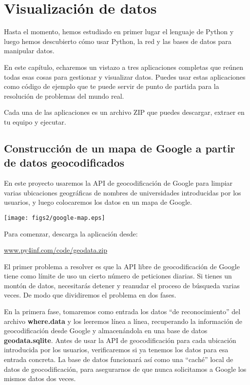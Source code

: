 
\chapter{Visualización de datos}

Hasta el momento, hemos estudiado en primer lugar el lenguaje de Python y luego
hemos descubierto cómo usar Python, la red y las bases de datos
para manipular datos.

En este capítulo, echaremos un vistazo a tres
aplicaciones completas que reúnen todas esas cosas
para gestionar y visualizar datos. Puedes usar estas aplicaciones
como código de ejemplo que te puede servir de punto de partida para la
resolución de problemas del mundo real.

Cada una de las aplicaciones es un archivo ZIP que puedes descargar,
extraer en tu equipo y ejecutar.

\section{Construcción de un mapa de Google a partir de datos geocodificados}

En este proyecto usaremos la API de geocodificación de Google
para limpiar varias ubicaciones geográficas de nombres de universidades
introducidas por los usuarios, y luego colocaremos los datos en
un mapa de Google. 

\beforefig
\centerline{\texttt{[image: figs2/google-map.eps]}}
\afterfig

Para comenzar, descarga la aplicación desde:

\url{www.py4inf.com/code/geodata.zip}

El primer problema a resolver es que la API libre de geocodificación
de Google tiene como límite de uso un cierto número de peticiones diarias. Si tienes
un montón de datos, necesitarás detener y reanudar el proceso de
búsqueda varias veces. De modo que dividiremos el problema en
dos fases.

En la primera fase, tomaremos como entrada los datos ``de reconocimiento'' del archivo
{\bf where.data} y los leeremos línea a línea, recuperando la
información de geocodificación desde Google y almacenándola
en una base de datos {\bf geodata.sqlite}.
Antes de usar la API de geocodificación para cada ubicación introducida por los usuarios,
verificaremos si ya tenemos los datos para esa entrada
concreta. La base de datos funcionará así como una ``caché'' local
de datos de geocodificación, para asegurarnos de que nunca solicitamos
a Google los mismos datos dos veces.

